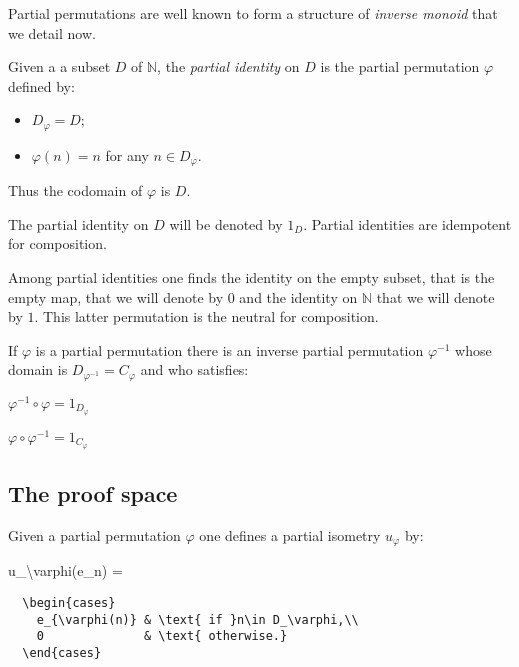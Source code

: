 Partial permutations are well known to form a structure of \emph{inverse
monoid} that we detail now.

Given a a subset \(D\) of \(\mathbb{N}\), the \emph{partial identity} on
\(D\) is the partial permutation \(\varphi\) defined by:

\begin{itemize}
\tightlist
\item
  \(D_\varphi = D\);
\item
  \(\varphi(n) = n\) for any \(n\in D_\varphi\).
\end{itemize}

Thus the codomain of \(\varphi\) is \(D\).

The partial identity on \(D\) will be denoted by \(1_D\). Partial
identities are idempotent for composition.

Among partial identities one finds the identity on the empty subset,
that is the empty map, that we will denote by \(0\) and the identity on
\(\mathbb{N}\) that we will denote by \(1\). This latter permutation is
the neutral for composition.

If \(\varphi\) is a partial permutation there is an inverse partial
permutation \(\varphi^{-1}\) whose domain is
\(D_{\varphi^{-1}} = C_{\varphi}\) and who satisfies:

\begin{description}
\tightlist
\item[]
\(\varphi^{-1}\circ\varphi = 1_{D_\varphi}\)

\(\varphi\circ\varphi^{-1} = 1_{C_\varphi}\)
\end{description}


\subsection{The proof space}\label{the-proof-space}

Given a partial permutation \(\varphi\) one defines a partial isometry
\(u_\varphi\) by:

\begin{description}
\tightlist
\item[]
u\_\textbackslash{}varphi(e\_n) =
\end{description}

\texttt{~~\textbackslash{}begin\{cases\}}\\
\texttt{~~~~e\_\{\textbackslash{}varphi(n)\}~\&~\textbackslash{}text\{~if~\}n\textbackslash{}in~D\_\textbackslash{}varphi,\textbackslash{}\textbackslash{}}\\
\texttt{~~~~0~~~~~~~~~~~~~~\&~\textbackslash{}text\{~otherwise.\}}\\
\texttt{~~\textbackslash{}end\{cases\}}\\
\texttt{~}

